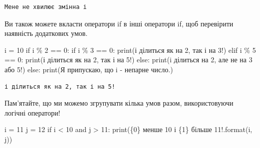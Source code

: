 \documentclass[
  letterpaper,
]{report}
\newenvironment{Shaded}{\begin{snugshade}}{\end{snugshade}}
\newcommand{\BuiltInTok}[1]{\textcolor[rgb]{0.00,0.23,0.31}{#1}}
\newcommand{\ControlFlowTok}[1]{\textcolor[rgb]{0.00,0.23,0.31}{#1}}
\newcommand{\DecValTok}[1]{\textcolor[rgb]{0.68,0.00,0.00}{#1}}
\newcommand{\KeywordTok}[1]{\textcolor[rgb]{0.00,0.23,0.31}{#1}}
\newcommand{\NormalTok}[1]{\textcolor[rgb]{0.00,0.23,0.31}{#1}}
\newcommand{\OperatorTok}[1]{\textcolor[rgb]{0.37,0.37,0.37}{#1}}
\newcommand{\SpecialCharTok}[1]{\textcolor[rgb]{0.37,0.37,0.37}{#1}}
\newcommand{\StringTok}[1]{\textcolor[rgb]{0.13,0.47,0.30}{#1}}
\begin{document}
\begin{verbatim}
Мене не хвилює змінна і
\end{verbatim}

Ви також можете вкласти оператори if в інші оператори if, щоб перевірити
наявність додаткових умов.

\begin{Shaded}
\begin{Highlighting}[]
\NormalTok{i }\OperatorTok{=} \DecValTok{10}
\ControlFlowTok{if}\NormalTok{ i }\OperatorTok{\%} \DecValTok{2} \OperatorTok{==} \DecValTok{0}\NormalTok{:}
    \ControlFlowTok{if}\NormalTok{ i }\OperatorTok{\%} \DecValTok{3} \OperatorTok{==} \DecValTok{0}\NormalTok{:}
        \BuiltInTok{print}\NormalTok{(}\StringTok{\textquotesingle{}і ділиться як на 2, так і на 3!\textquotesingle{}}\NormalTok{)}
    \ControlFlowTok{elif}\NormalTok{ i }\OperatorTok{\%} \DecValTok{5} \OperatorTok{==} \DecValTok{0}\NormalTok{:}
        \BuiltInTok{print}\NormalTok{(}\StringTok{\textquotesingle{}і ділиться як на 2, так і на 5!\textquotesingle{}}\NormalTok{)}
    \ControlFlowTok{else}\NormalTok{:}
        \BuiltInTok{print}\NormalTok{(}\StringTok{\textquotesingle{}i ділиться на 2, але не на 3 або 5!\textquotesingle{}}\NormalTok{)}
\ControlFlowTok{else}\NormalTok{:}
    \BuiltInTok{print}\NormalTok{(}\StringTok{\textquotesingle{}Я припускаю, що i {-} непарне число.\textquotesingle{}}\NormalTok{)}
\end{Highlighting}
\end{Shaded}

\begin{verbatim}
і ділиться як на 2, так і на 5!
\end{verbatim}

Пам'ятайте, що ми можемо згрупувати кілька умов разом, використовуючи
логічні оператори!

\begin{Shaded}
\begin{Highlighting}[]
\NormalTok{i }\OperatorTok{=} \DecValTok{11}
\NormalTok{j }\OperatorTok{=} \DecValTok{12}
\ControlFlowTok{if}\NormalTok{ i }\OperatorTok{\textless{}} \DecValTok{10} \KeywordTok{and}\NormalTok{ j }\OperatorTok{\textgreater{}} \DecValTok{11}\NormalTok{:}
    \BuiltInTok{print}\NormalTok{(}\StringTok{\textquotesingle{}}\SpecialCharTok{\{0\}}\StringTok{ менше 10 і }\SpecialCharTok{\{1\}}\StringTok{ більше 11!\textquotesingle{}}\NormalTok{.}\BuiltInTok{format}\NormalTok{(i, j))}
\end{Highlighting}
\end{Shaded}
\end{document}
